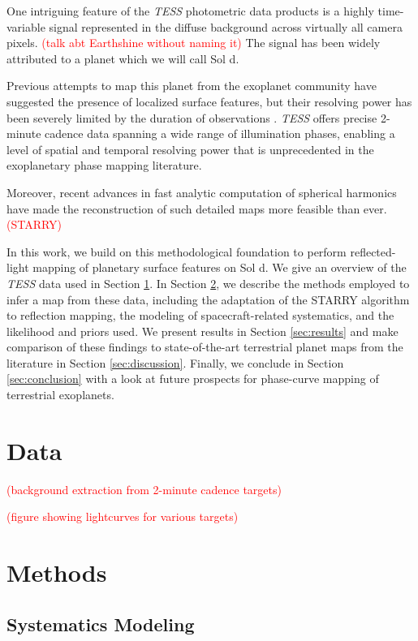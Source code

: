 \documentclass[modern]{aastex62}
\newcommand{\TESS}{\emph{TESS}\xspace}
\newcommand{\todo}[1]{\textcolor{red}{#1}}
\begin{document}
One intriguing feature of the \TESS photometric data products is a highly time-variable signal represented in the diffuse background across virtually all camera pixels. 
\todo{(talk abt Earthshine without naming it)} 
The signal has been widely attributed to a planet which we will call Sol d.

Previous attempts to map this planet from the exoplanet community have suggested the presence of localized surface features, but their resolving power has been severely limited by the duration of observations \citep{Cowan2009}. 
\TESS offers precise 2-minute cadence data spanning a wide range of illumination phases, enabling a level of spatial and temporal resolving power that is unprecedented in the exoplanetary phase mapping literature. 

Moreover, recent advances in fast analytic computation of spherical harmonics have made the reconstruction of such detailed maps more feasible than ever. 
\todo{(STARRY)}

In this work, we build on this methodological foundation to perform reflected-light mapping of planetary surface features on Sol d. 
We give an overview of the \TESS data used in Section \ref{sec:data}. 
In Section \ref{sec:methods}, we describe the methods employed to infer a map from these data, including the adaptation of the STARRY algorithm to reflection mapping, the modeling of spacecraft-related systematics, and the likelihood and priors used. 
We present results in Section \ref{sec:results} and make comparison of these findings to state-of-the-art terrestrial planet maps from the literature in Section \ref{sec:discussion}. 
Finally, we conclude in Section \ref{sec:conclusion} with a look at future prospects for phase-curve mapping of terrestrial exoplanets.

\section{Data}
\label{sec:data}

\todo{(background extraction from 2-minute cadence targets)}

\todo{(figure showing lightcurves for various targets)}

\section{Methods}
\label{sec:methods}

\subsection{Systematics Modeling}
\end{document}
